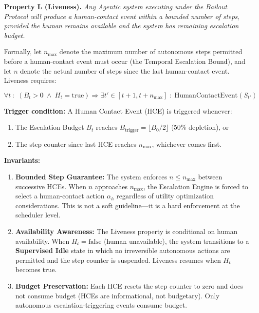 \textbf{Property L (Liveness).} \emph{Any Agentic system executing under the Bailout Protocol will produce a human-contact event within a bounded number of steps, provided the human remains available and the system has remaining escalation budget.}

Formally, let $n_\text{max}$ denote the maximum number of autonomous steps permitted before a human-contact event must occur (the Temporal Escalation Bound), and let $n$ denote the actual number of steps since the last human-contact event. Liveness requires:

\[
\forall t \;:\; (B_t > 0 \;\land\; H_t = \text{true}) \Rightarrow \exists t' \in [t+1, t+n_\text{max}] \;:\; \text{HumanContactEvent}(S_{t'})
\]

\textbf{Trigger condition:} A Human Contact Event (HCE) is triggered whenever:
\begin{enumerate}
    \item The Escalation Budget $B_t$ reaches $B_\text{trigger} = \lfloor B_0 / 2 \rfloor$ (50\% depletion), or
    \item The step counter since last HCE reaches $n_\text{max}$, whichever comes first.
\end{enumerate}

\textbf{Invariants:}

\begin{enumerate}
    \item \textbf{Bounded Step Guarantee:} The system enforces $n \leq n_\text{max}$ between successive HCEs. When $n$ approaches $n_\text{max}$, the Escalation Engine is forced to select a human-contact action $\alpha_h$ regardless of utility optimization considerations. This is not a soft guideline—it is a hard enforcement at the scheduler level.

    \item \textbf{Availability Awareness:} The Liveness property is conditional on human availability. When $H_t = \text{false}$ (human unavailable), the system transitions to a \textbf{Supervised Idle} state in which no irreversible autonomous actions are permitted and the step counter is suspended. Liveness resumes when $H_t$ becomes true.

    \item \textbf{Budget Preservation:} Each HCE resets the step counter to zero and does not consume budget (HCEs are informational, not budgetary). Only autonomous escalation-triggering events consume budget.
\end{enumerate}

